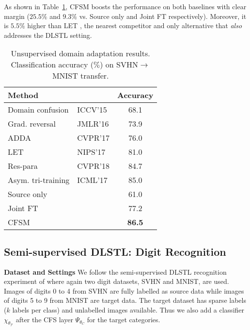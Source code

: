 \documentclass[letterpaper]{article} \usepackage{aaai19}  \usepackage{times}  \usepackage{helvet}  \usepackage{courier}  \usepackage{url}  \usepackage{graphicx}
\newcommand{\keypoint}[1]{\noindent\textbf{#1}\quad}
\begin{document}
As shown in Table~\ref{tab:UDA_svhn_mnist}, CFSM boosts the performance on both baselines with clear margin ($25.5\%$ and $9.3\%$ vs. Source only and Joint FT respectively). Moreover, it is $5.5\%$ higher than LET \cite{label_eff_open_da_2017}, the nearest competitor and only alternative that \emph{also} addresses the DLSTL setting.


\begin{table}[t]
\centering
\small
\begin{tabular}{llc}
\hline
Method           &       &Accuracy \\ \hline
Domain confusion & ICCV'15 & 68.1    \\
Grad. reversal   & JMLR'16 & 73.9    \\
ADDA             & CVPR'17 & 76.0    \\
LET	             & NIPS'17 & 81.0    \\ 
Res-para         & CVPR'18 & 84.7    \\ 
Asym. tri-training     & ICML'17 & 85.0    \\ \hline
Source only      &  & 61.0    \\
Joint FT         &  & 77.2    \\
CFSM             &  & {\bf 86.5}    \\ \hline
\end{tabular}
\caption{Unsupervised domain adaptation results. Classification accuracy ($\%$) on SVHN$\to$MNIST transfer.}
\label{tab:UDA_svhn_mnist}
\end{table}

\subsection{Semi-supervised DLSTL: Digit Recognition}\label{Sec:DLSTL_category}
\begin{comment}
\textcolor{red}{Now we use one network branch while \cite{label_eff_open_da_2017} are with two branches, source and target respectively. Though we can achieves better results with smaller model size, it would be better to follow the architecture as in \cite{label_eff_open_da_2017}. Otherwise, we may no need to point out such difference on architecture.}
\end{comment}
\keypoint{Dataset and Settings} We follow the semi-supervised DLSTL recognition experiment of \cite{label_eff_open_da_2017} where again two digit  datasets, SVHN and MNIST, are used. Images of digits 0 to 4 from SVHN are fully labelled as source data while images of digits 5 to 9 from MNIST are target data. The target dataset has sparse labels ($k$ labels per class) and unlabelled images available. Thus we also add a classifier $\chi_{\theta_\mathcal{T}}$ after the CFS layer $\Psi_{\theta_C}$ for the target categories. 
\end{document}
